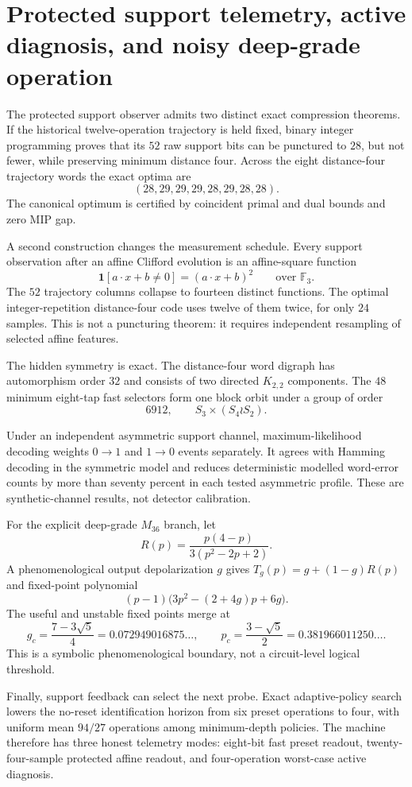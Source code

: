 \section{Protected support telemetry, active diagnosis, and noisy deep-grade operation}
\label{sec:bt2847-2853}

The protected support observer admits two distinct exact compression theorems. If the
historical twelve-operation trajectory is held fixed, binary integer programming proves
that its $52$ raw support bits can be punctured to $28$, but not fewer, while preserving
minimum distance four. Across the eight distance-four trajectory words the exact optima
are
\[
(28,29,29,29,28,29,28,28).
\]
The canonical optimum is certified by coincident primal and dual bounds and zero MIP gap.

A second construction changes the measurement schedule. Every support observation after
an affine Clifford evolution is an affine-square function
\[
\mathbf 1[a\cdot x+b\ne0]=(a\cdot x+b)^2\qquad\text{over }\mathbb F_3.
\]
The $52$ trajectory columns collapse to fourteen distinct functions. The optimal
integer-repetition distance-four code uses twelve of them twice, for only $24$ samples.
This is not a puncturing theorem: it requires independent resampling of selected affine
features.

The hidden symmetry is exact. The distance-four word digraph has automorphism order
$32$ and consists of two directed $K_{2,2}$ components. The $48$ minimum eight-tap fast
selectors form one block orbit under a group of order
\[
6912,
\qquad
S_3\times(S_4\wr S_2).
\]

Under an independent asymmetric support channel, maximum-likelihood decoding weights
$0\to1$ and $1\to0$ events separately. It agrees with Hamming decoding in the symmetric
model and reduces deterministic modelled word-error counts by more than seventy percent
in each tested asymmetric profile. These are synthetic-channel results, not detector
calibration.

For the explicit deep-grade $M_{36}$ branch, let
\[
R(p)=\frac{p(4-p)}{3(p^2-2p+2)}.
\]
A phenomenological output depolarization $g$ gives $T_g(p)=g+(1-g)R(p)$ and fixed-point
polynomial
\[
(p-1)\bigl(3p^2-(2+4g)p+6g\bigr).
\]
The useful and unstable fixed points merge at
\[
 g_c=\frac{7-3\sqrt5}{4}=0.072949016875\ldots,
 \qquad
 p_c=\frac{3-\sqrt5}{2}=0.381966011250\ldots .
\]
This is a symbolic phenomenological boundary, not a circuit-level logical threshold.

Finally, support feedback can select the next probe. Exact adaptive-policy search lowers
the no-reset identification horizon from six preset operations to four, with uniform mean
$94/27$ operations among minimum-depth policies. The machine therefore has three honest
telemetry modes: eight-bit fast preset readout, twenty-four-sample protected affine
readout, and four-operation worst-case active diagnosis.
